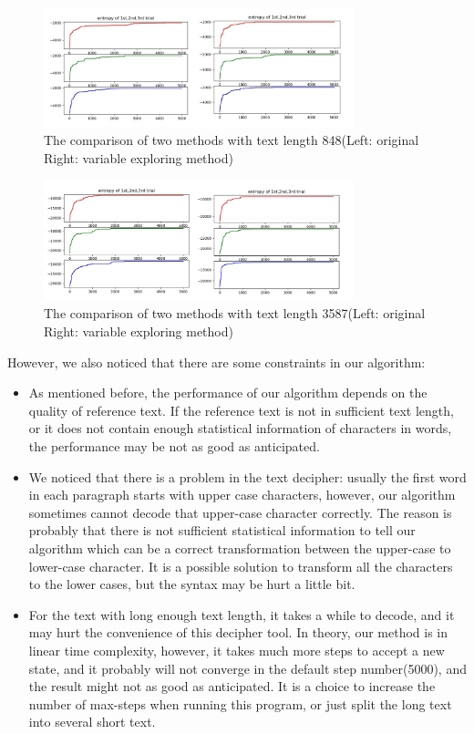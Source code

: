 \documentclass{acmtog} %
\begin{document}
\begin{figure}[htb]
\centerline{\includegraphics[width=9cm]{pic/compare848.jpg}}
\caption{The comparison of two methods with text length 848(Left: original Right: variable exploring method)}
\label{compare1}
\end{figure}

\begin{figure}[htb]
\centerline{\includegraphics[width=9cm]{pic/compare3587.png}}
\caption{The comparison of two methods with text length 3587(Left: original Right: variable exploring method)}
  \label{compare2}
\end{figure}
However, we also noticed that there are some constraints in our algorithm:
\begin{itemize}
    \item As mentioned before, the performance of our algorithm depends on the quality of reference text. If the reference text is not in sufficient text length, or it does not contain enough statistical information of characters in words, the performance may be not as good as anticipated.
    \item We noticed that there is a problem in the text decipher: usually the first word in each paragraph starts with upper case characters, however, our algorithm sometimes cannot decode that upper-case character correctly. The reason is probably that there is not sufficient statistical information to tell our algorithm which can be a correct transformation between the upper-case to lower-case character. It is a possible solution to transform all the characters to the lower cases, but the syntax may be hurt a little bit.
    \item For the text with long enough text length, it takes a while to decode, and it may hurt the convenience of this decipher tool. In theory, our method is in linear time complexity, however, it takes much more steps to accept a new state, and it probably will not converge in the default step number(5000), and the result might not as good as anticipated. It is a choice to increase the number of max-steps when running this program, or just split the long text into several short text.
\end{itemize}
\end{document}
